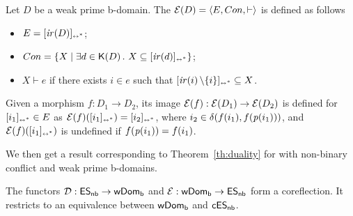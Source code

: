 \begin{definition}
  \label{a-de:es-for-dom}
  Let $D$ be a weak prime b-domain. The {\esnabbr} 
  $\mathcal{E}({D}) = \langle E, Con, \vdash \rangle$ is defined as
  follows
  \begin{itemize}

  \item $E = [{\mathop{\mathit{ir}({D})}}]_{\scriptscriptstyle {\leftrightarrow^*}}$;

  \item
    $Con = \{ X \mid \exists d \in \mathop{\mathsf{K}({D})}.\ X \subseteq
    [{\mathop{\mathit{ir}({d})}}]_{\scriptscriptstyle {\leftrightarrow^*}} \}$;

  \item $X \vdash e$ if there exists $i \in e$ such that
    $[{\mathop{\mathit{ir}({i})} \setminus \{ i \}}]_{\scriptscriptstyle {\leftrightarrow^*}} \subseteq X$.

  \end{itemize}

Given a morphism $f : D_1 \to D_2$, its image
$\mathcal{E}({f}) : \mathcal{E}({D_1}) \to \mathcal{E}({D_2})$ is defined for
$[{i_1}]_{\scriptscriptstyle {\leftrightarrow^*}} \in E$ as
$\mathcal{E}({f})([{i_1}]_{\scriptscriptstyle {\leftrightarrow^*}}) = [{i_2}]_{\scriptscriptstyle {\leftrightarrow^*}}$, where
 $i_2 \in \delta({f(i_1)},{f(\mathit{p}({i_1}))})$,
and $\mathcal{E}({f})([{i_1}]_{\scriptscriptstyle {\leftrightarrow^*}})$ is undefined if
$f(\mathit{p}({i_1})) = f(i_1)$.
\end{definition}
 

We then get a result corresponding to Theorem~\ref{th:duality} for {\esabbr}
with non-binary conflict and  weak prime b-domains.

\begin{theorem}
 \label{th:es-dom-equivalence-non-binary}
 The functors $\mathcal{D} : \mathsf{ES_{nb}} \to \mathsf{wDom_b}$ and $\mathcal{E} : \mathsf{wDom_b} \to \mathsf{ES_{nb}}$
 form a coreflection.  It restricts to an equivalence between $\mathsf{wDom_b}$
 and $\mathsf{cES_{nb}}$.
\end{theorem}


